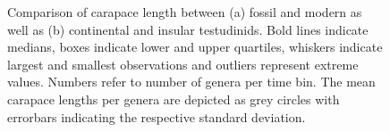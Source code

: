 \begin{center}
	\begin{figure}[htbp]
		\caption[Comparing carapace lengths between fossil/modern and continental/insular testudinids]{Comparison of carapace length between (a) fossil and modern as well as (b) continental and insular testudinids. Bold lines indicate medians, boxes indicate lower and upper quartiles, whiskers indicate largest and smallest observations and outliers represent extreme values. Numbers refer to number of genera per time bin. The mean carapace lengths per genera are depicted as grey circles with errorbars indicating the respective standard deviation.}
		\label{fig:boxFMCI}
	\end{figure}
\end{center}



